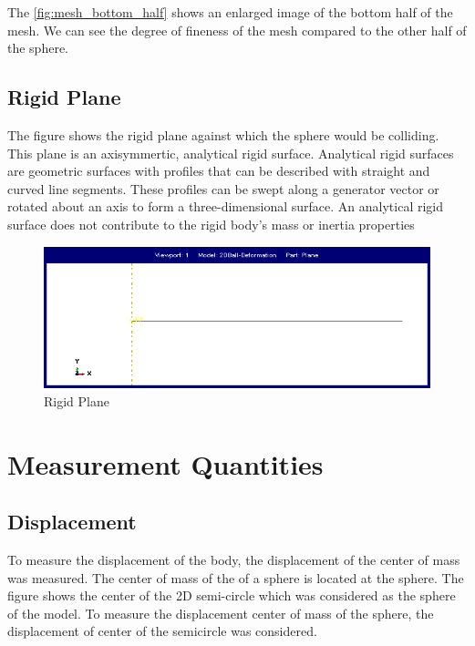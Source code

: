 The \ref{fig:mesh_bottom_half} shows an enlarged image of the bottom half of the mesh. We can see the degree of fineness of the mesh compared to the other half of the sphere.


\subsection{Rigid Plane}

The figure shows the rigid plane against which the sphere would be colliding. This plane is an axisymmertic, analytical rigid surface.
Analytical rigid surfaces are geometric surfaces with profiles that can be described with straight and curved line segments. These profiles can be swept along a generator vector or rotated about an axis to form a three-dimensional surface. An analytical rigid surface does not contribute to the rigid body's mass or inertia properties 

\begin{figure}[H]
    \centering
	\includegraphics[scale=0.075]{../images/SimulationSetup/Plane.png}
	\caption{Rigid Plane}
	\label{fig:plane}
\end{figure}


\section{Measurement Quantities}

\subsection{Displacement}

To measure the displacement of the body, the displacement of the center of mass was measured. The center of mass of the of a sphere is located at the sphere. The figure shows the center of the 2D semi-circle which was considered as the sphere of the model. To measure the displacement center of mass of the sphere, the displacement of center of the semicircle was considered.

